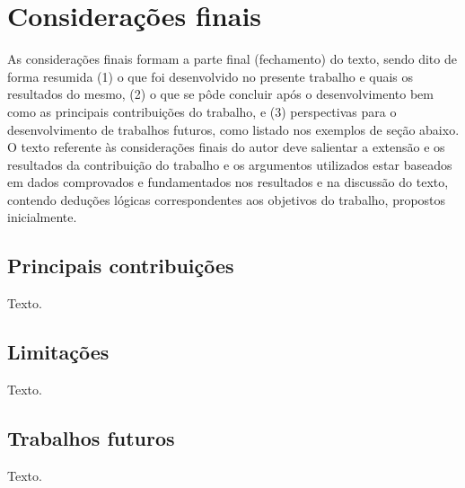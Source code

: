 \chapter{Considerações finais}

As considerações finais formam a parte final (fechamento) do texto, sendo dito
de forma resumida (1) o que foi desenvolvido no presente trabalho e quais os
resultados do mesmo, (2) o que se pôde concluir após o desenvolvimento bem como
as principais contribuições do trabalho, e (3) perspectivas para o
desenvolvimento de trabalhos futuros, como listado nos exemplos de seção abaixo.
O texto referente às considerações finais do autor deve salientar a extensão e
os resultados da contribuição do trabalho e os argumentos utilizados estar
baseados em dados comprovados e fundamentados nos resultados e na discussão do
texto, contendo deduções lógicas correspondentes aos objetivos do trabalho,
propostos inicialmente.


\section{Principais contribuições}

Texto.


\section{Limitações}

Texto.


\section{Trabalhos futuros}

Texto.